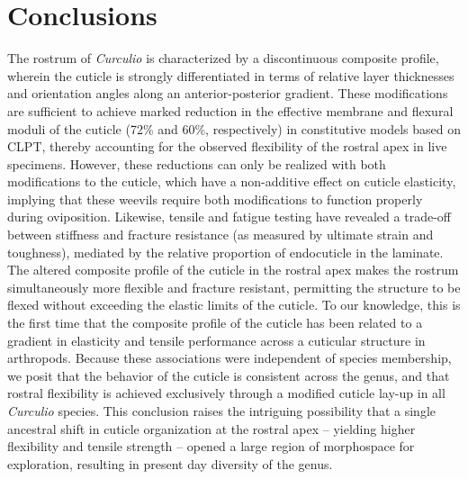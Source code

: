 \documentclass[twocolumn, linenumbers, superscriptaddress, nofootinbib]{revtex4-1}
\begin{document}
	\section{Conclusions}

		The rostrum of \textit{Curculio} is characterized by a discontinuous composite profile, wherein the cuticle is strongly differentiated in terms of relative layer thicknesses and orientation angles along an anterior-posterior gradient.		
		These modifications are sufficient to achieve marked reduction in the effective membrane and flexural moduli of the cuticle (72\% and 60\%, respectively) in constitutive models based on CLPT, thereby accounting for the observed flexibility of the rostral apex in live specimens.
		However, these reductions can only be realized with both modifications to the cuticle, which have a non-additive effect on cuticle elasticity, implying that these weevils require both modifications to function properly during oviposition.
		Likewise, tensile and fatigue testing have revealed a trade-off between stiffness and fracture resistance (as measured by ultimate strain and toughness), mediated by the relative proportion of endocuticle in the laminate.
		The altered composite profile of the cuticle in the rostral apex makes the rostrum simultaneously more flexible and fracture resistant, permitting the structure to be flexed without exceeding the elastic limits of the cuticle.
		To our knowledge, this is the first time that the composite profile of the cuticle has been related to a gradient in elasticity and tensile performance across a cuticular structure in arthropods.
		Because these associations were independent of species membership, we posit that the behavior of the cuticle is consistent across the genus, and that rostral flexibility is achieved exclusively through a modified cuticle lay-up in all \textit{Curculio} species.
		This conclusion raises the intriguing possibility that a single ancestral shift in cuticle organization at the rostral apex -- yielding higher flexibility and tensile strength -- opened a large region of morphospace for exploration, resulting in present day diversity of the genus.
		
\end{document}
